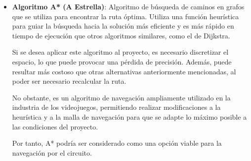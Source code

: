 \begin{itemize}
   \item \textbf{Algoritmo A* (A Estrella)}: Algoritmo de búsqueda de caminos en grafos que se utiliza para encontrar la ruta óptima. Utiliza una función heurística para guiar la búsqueda hacia la solución más eficiente y es más rápido en tiempo de ejecución que otros algoritmos similares, como el de Dijkstra.
   
   Si se desea aplicar este algoritmo al proyecto, es necesario discretizar el espacio, lo que puede provocar una pérdida de precisión. Además, puede resultar más costoso que otras alternativas anteriormente mencionadas, al poder ser necesario recalcular la ruta.

   No obstante, es un algoritmo de navegación ampliamente utilizado en la industria de los videojuegos, permitiendo realizar modificaciones a la heurística y a la malla de navegación para que se adapte lo máximo posible a las condiciones del proyecto.

   Por tanto, A* podría ser considerado como una opción viable para la navegación por el circuito.

\end{itemize}